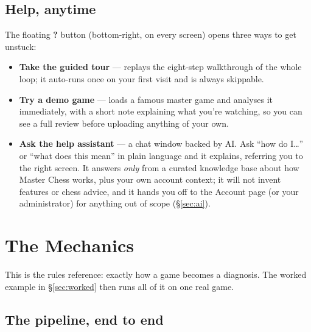 \documentclass[11pt]{article}
\begin{document}
\subsection{Help, anytime}\label{sec:help}

The floating \textbf{?} button (bottom-right, on every screen) opens three ways
to get unstuck:
\begin{itemize}[leftmargin=1.4em, itemsep=1pt]
  \item \textbf{Take the guided tour} --- replays the eight-step walkthrough of
  the whole loop; it auto-runs once on your first visit and is always skippable.
  \item \textbf{Try a demo game} --- loads a famous master game and analyses it
  immediately, with a short note explaining what you're watching, so you can see
  a full review before uploading anything of your own.
  \item \textbf{Ask the help assistant} --- a chat window backed by AI. Ask
  ``how do I\dots'' or ``what does this mean'' in plain language and it explains,
  referring you to the right screen. It answers \emph{only} from a curated
  knowledge base about how Master Chess works, plus your own account context; it
  will not invent features or chess advice, and it hands you off to the Account
  page (or your administrator) for anything out of scope (\S\ref{sec:ai}).
\end{itemize}

\section{The Mechanics}\label{sec:mechanics}

This is the rules reference: exactly how a game becomes a diagnosis. The
worked example in \S\ref{sec:worked} then runs all of it on one real game.

\subsection{The pipeline, end to end}
\end{document}
